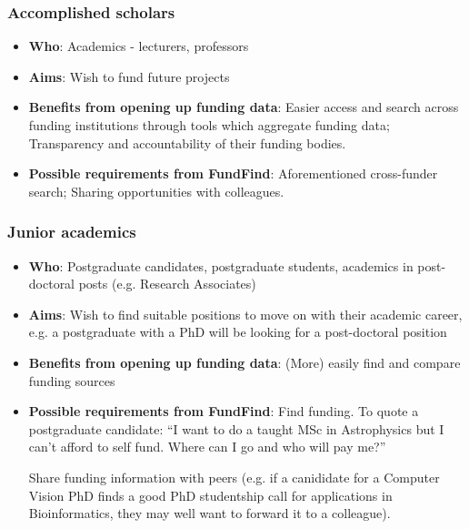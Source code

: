 \subsubsection{Accomplished scholars}
\begin{itemize}
 \item \textbf{Who}: Academics - lecturers, professors
 \item \textbf{Aims}: Wish to fund future projects
 \item \textbf{Benefits from opening up funding data}: Easier access and search across funding institutions through tools which aggregate funding data; Transparency and accountability of their funding bodies.
 \item \textbf{Possible requirements from FundFind}: Aforementioned cross-funder search; Sharing opportunities with colleagues.
\end{itemize}

\subsubsection{Junior academics}
\begin{itemize}
 \item \textbf{Who}: Postgraduate candidates, postgraduate students, academics in post-doctoral posts (e.g. Research Associates)
 \item \textbf{Aims}: Wish to find suitable positions to move on with their academic career, e.g. a postgraduate with a PhD will be looking for a post-doctoral position
 \item \textbf{Benefits from opening up funding data}: (More) easily find and compare funding sources
 \item \textbf{Possible requirements from FundFind}: Find funding. To quote a postgraduate candidate: ``I want to do a taught MSc in Astrophysics but I can't afford to self fund. Where can I go and who will pay me?''
 
 Share funding information with peers (e.g. if a canididate for a Computer Vision PhD finds a good PhD studentship call for applications in Bioinformatics, they may well want to forward it to a colleague).
\end{itemize}

